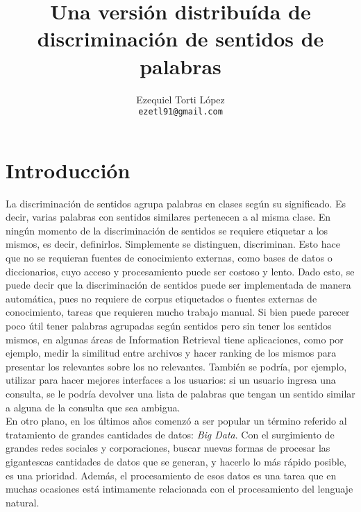 \documentclass[11pt]{article}
\title{\vspace{-15mm}\fontsize{14pt}{10pt}\selectfont\textbf{Una versión distribuída de discriminación de sentidos de palabras}} %
\author{
\normalsize{Ezequiel Torti L\'opez}\\[2mm] %
\texttt{ezetl91@gmail.com} %
}
\begin{document}
\maketitle
{}
\section{Introducción}
La discriminación de sentidos agrupa palabras en clases según su significado. Es decir, varias palabras con sentidos similares pertenecen a al misma clase.
En ningún momento de la discriminación de sentidos se requiere etiquetar a los mismos, es decir, definirlos. Simplemente se distinguen, discriminan. Esto hace que no se requieran fuentes de conocimiento externas, como bases de datos o diccionarios, cuyo acceso y procesamiento puede ser costoso y lento. Dado esto, se puede decir que la discriminación de sentidos puede ser implementada de manera automática, pues no requiere de corpus etiquetados o fuentes externas de conocimiento, tareas que requieren mucho trabajo manual.
Si bien puede parecer poco útil tener palabras agrupadas según sentidos pero sin tener los sentidos mismos, en algunas áreas de Information Retrieval tiene aplicaciones, como por ejemplo, medir la similitud entre archivos y hacer ranking de los mismos para presentar los relevantes sobre los no relevantes. También se podría, por ejemplo, utilizar para hacer mejores interfaces a los usuarios: si un usuario ingresa una consulta, se le podría devolver una lista de palabras que tengan un sentido similar a alguna de la consulta que sea ambigua.
\\
En otro plano, en los últimos años comenzó a ser popular un término referido al tratamiento de grandes cantidades de datos: \emph{Big Data}. Con el surgimiento de grandes redes sociales y corporaciones, buscar nuevas formas de procesar las gigantescas cantidades de datos que se generan, y hacerlo lo más rápido posible, es una prioridad. Además, el procesamiento de esos datos es una tarea que en muchas ocasiones está intimamente relacionada con el procesamiento del lenguaje natural.
\end{document}
